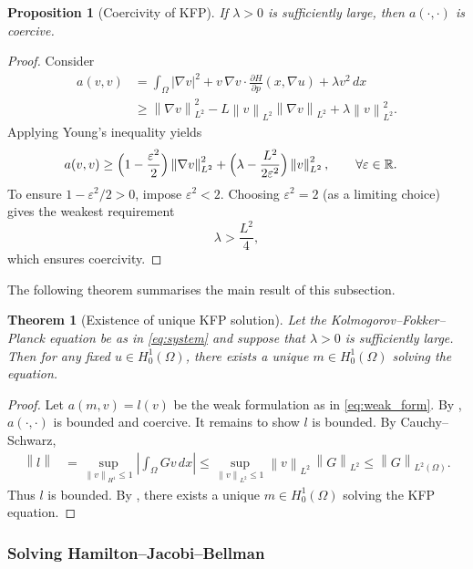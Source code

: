 \documentclass[11pt]{article}
\numberwithin{equation}{section}
\newtheorem{theorem}{Theorem}[section]
\newtheorem{proposition}[proposition]{Proposition}
\theoremstyle{definition}
\theoremstyle{remark}
\newcommand{\R}{\mathbb{R}}
\newcommand{\Ltwo}{L^2(\Omega)}
\newcommand{\Honez}{H_0^1(\Omega)}
\newcommand{\Hp}{\frac{\partial H}{\partial p}}
\newcommand{\norm}[1]{\left\lVert #1 \right\rVert}
\begin{document}
\begin{proposition}[Coercivity of KFP]\label{prop:kfp-coercive}
If $\lambda > 0$ is sufficiently large, then $a(\cdot,\cdot)$ is coercive.
\end{proposition}

\begin{proof}
Consider
\begin{align*}
a(v,v)
&= \int_\Omega |\nabla v|^2 + v\,\nabla v\cdot\Hp(x,\nabla u)+\lambda v^2\,dx\\
&\ge \norm{\nabla v}_{L^2}^2 - L\norm{v}_{L^2}\norm{\nabla v}_{L^2} + \lambda\norm{v}_{L^2}^2.
\end{align*}
Applying Young's inequality yields
\begin{align*}
a(v,v)
&\ge \Bigl(1-\frac{\varepsilon^2}{2}\Bigr)\norm{\nabla v}_{L^2}^2
  + \Bigl(\lambda-\frac{L^2}{2\varepsilon^2}\Bigr)\norm{v}_{L^2}^2,
  \qquad \forall \varepsilon\in\R.
\end{align*}
To ensure $1-\varepsilon^2/2>0$, impose $\varepsilon^2<2$. Choosing $\varepsilon^2=2$ (as a limiting choice) gives the weakest requirement
\[
\lambda>\frac{L^2}{4},
\]
which ensures coercivity.
\end{proof}

The following theorem summarises the main result of this subsection. 
\begin{theorem}[Existence of unique KFP solution]\label{thm:solution_kfp}
Let the Kolmogorov--Fokker--Planck equation be as in \cref{eq:system} and suppose that $\lambda > 0$ is sufficiently large.
Then for any fixed $u \in \Honez$, there exists a unique $m \in \Honez$ solving the equation.
\end{theorem}

\begin{proof}
Let $a(m,v)=l(v)$ be the weak formulation as in \cref{eq:weak_form}. By , $a(\cdot,\cdot)$ is bounded and coercive.
It remains to show $l$ is bounded. By Cauchy--Schwarz,
\begin{align*}
\norm{l}
&= \sup_{\norm{v}_{H^1}\le 1}\left|\int_\Omega Gv\,dx\right|
\le \sup_{\norm{v}_{L^2}\le 1}\norm{v}_{L^2}\,\norm{G}_{L^2}
\le \norm{G}_{\Ltwo}.
\end{align*}
Thus $l$ is bounded. By , there exists a unique $m\in\Honez$ solving the KFP equation.
\end{proof}

\subsubsection{Solving Hamilton--Jacobi--Bellman}
\end{document}
